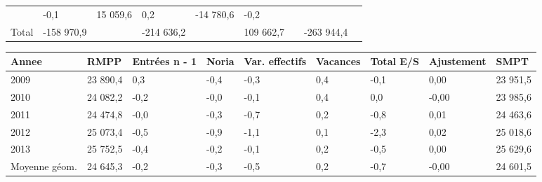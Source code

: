 \begin{longtable}[]{@{}lllllllll@{}}
\begin{minipage}[t]{0.16\columnwidth}
\end{minipage} & \begin{minipage}[t]{0.06\columnwidth}\raggedright
-0,1\strut
\end{minipage} & \begin{minipage}[t]{0.12\columnwidth}\raggedright
15 059,6\strut
\end{minipage} & \begin{minipage}[t]{0.06\columnwidth}\raggedright
0,2\strut
\end{minipage} & \begin{minipage}[t]{0.09\columnwidth}\raggedright
-14 780,6\strut
\end{minipage} & \begin{minipage}[t]{0.06\columnwidth}\raggedright
-0,2\strut
\end{minipage}\tabularnewline
\begin{minipage}[t]{0.05\columnwidth}\raggedright
Total\strut
\end{minipage} & \begin{minipage}[t]{0.10\columnwidth}\raggedright
-158 970,9\strut
\end{minipage} & \begin{minipage}[t]{0.06\columnwidth}\raggedright
\strut
\end{minipage} & \begin{minipage}[t]{0.16\columnwidth}\raggedright
-214 636,2\strut
\end{minipage} & \begin{minipage}[t]{0.06\columnwidth}\raggedright
\strut
\end{minipage} & \begin{minipage}[t]{0.12\columnwidth}\raggedright
109 662,7\strut
\end{minipage} & \begin{minipage}[t]{0.06\columnwidth}\raggedright
\strut
\end{minipage} & \begin{minipage}[t]{0.09\columnwidth}\raggedright
-263 944,4\strut
\end{minipage} & \begin{minipage}[t]{0.06\columnwidth}\raggedright
\strut
\end{minipage}\tabularnewline
\bottomrule
\end{longtable}

\begin{longtable}[]{@{}lllllllll@{}}
\toprule
Annee & RMPP & Entrées n - 1 & Noria & Var. effectifs & Vacances & Total
E/S & Ajustement & SMPT\tabularnewline
\midrule
\endhead
2009 & 23 890,4 & 0,3 & -0,4 & -0,3 & 0,4 & -0,1 & 0,00 & 23
951,5\tabularnewline
2010 & 24 082,2 & -0,2 & -0,0 & -0,1 & 0,4 & 0,0 & -0,00 & 23
985,6\tabularnewline
2011 & 24 474,8 & -0,0 & -0,3 & -0,7 & 0,2 & -0,8 & 0,01 & 24
463,6\tabularnewline
2012 & 25 073,4 & -0,5 & -0,9 & -1,1 & 0,1 & -2,3 & 0,02 & 25
018,6\tabularnewline
2013 & 25 752,5 & -0,4 & -0,2 & -0,1 & 0,2 & -0,5 & 0,00 & 25
629,6\tabularnewline
Moyenne géom. & 24 645,3 & -0,2 & -0,3 & -0,5 & 0,2 & -0,7 & -0,00 & 24
601,5\tabularnewline
\bottomrule
\end{longtable}

